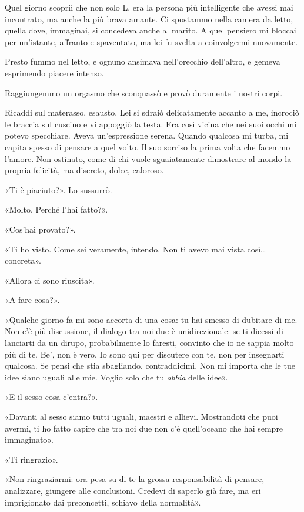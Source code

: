 Quel giorno scoprii che non solo L. era la persona più intelligente che avessi mai incontrato, ma
anche la più brava amante. Ci spostammo nella camera da letto, quella dove, immaginai, si concedeva
anche al marito. A quel pensiero mi bloccai per un'istante, affranto e spaventato, ma lei fu svelta
a coinvolgermi nuovamente.

Presto fummo nel letto, e ognuno ansimava nell'orecchio dell'altro, e gemeva esprimendo piacere
intenso.

Raggiungemmo un orgasmo che sconquassò e provò duramente i nostri corpi.

Ricaddi sul materasso, esausto. Lei si sdraiò delicatamente accanto a me, incrociò le braccia sul
cuscino e vi appoggiò la testa. Era così vicina che nei suoi occhi mi potevo specchiare. Aveva
un'espressione serena. Quando qualcosa mi turba, mi capita spesso di pensare a quel volto. Il suo
sorriso la prima volta che facemmo l'amore. Non ostinato, come di chi vuole sguaiatamente dimostrare
al mondo la propria felicità, ma discreto, dolce, caloroso.

«Ti è piaciuto?». Lo sussurrò.

«Molto. Perché l'hai fatto?».

«Cos'hai provato?».

«Ti ho visto. Come sei veramente, intendo. Non ti avevo mai vista così\dots{} concreta».

«Allora ci sono riuscita».

«A fare cosa?».

«Qualche giorno fa mi sono accorta di una cosa: tu hai smesso di dubitare di me. Non c'è più
discussione, il dialogo tra noi due è unidirezionale: se ti dicessi di lanciarti da un dirupo,
probabilmente lo faresti, convinto che io ne sappia molto più di te. Be', non è vero. Io sono qui
per discutere con te, non per insegnarti qualcosa. Se pensi che stia sbagliando, contraddicimi. Non
mi importa che le tue idee siano uguali alle mie. Voglio solo che tu \emph{abbia} delle idee».

«E il sesso cosa c'entra?».

«Davanti al sesso siamo tutti uguali, maestri e allievi. Mostrandoti che puoi avermi, ti ho fatto
capire che tra noi due non c'è quell'oceano che hai sempre immaginato».

«Ti ringrazio».

«Non ringraziarmi: ora pesa su di te la grossa responsabilità di pensare, analizzare, giungere alle
conclusioni. Credevi di saperlo già fare, ma eri imprigionato dai preconcetti, schiavo della
normalità».

